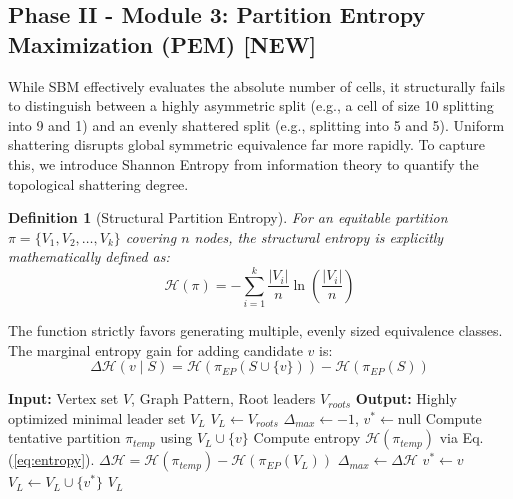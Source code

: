 \documentclass{IEEEtran}
\newtheorem{definition}{Definition}
\begin{document}
	\subsection{Phase II - Module 3: Partition Entropy Maximization (PEM) [NEW]}
	While SBM effectively evaluates the absolute number of cells, it structurally fails to distinguish between a highly asymmetric split (e.g., a cell of size 10 splitting into 9 and 1) and an evenly shattered split (e.g., splitting into 5 and 5). Uniform shattering disrupts global symmetric equivalence far more rapidly. To capture this, we introduce Shannon Entropy from information theory to quantify the topological shattering degree.
	
	\begin{definition}[Structural Partition Entropy]
		For an equitable partition $\pi = \{V_1, V_2, \dots, V_k\}$ covering $n$ nodes, the structural entropy is explicitly mathematically defined as:
		\begin{equation}
			\mathcal{H}(\pi) = - \sum_{i=1}^k \frac{|V_i|}{n} \ln \left( \frac{|V_i|}{n} \right) \label{eq:entropy}
		\end{equation}
	\end{definition}
	
	The function strictly favors generating multiple, evenly sized equivalence classes. The marginal entropy gain for adding candidate $v$ is:
	\begin{equation}
		\Delta \mathcal{H}(v \mid S) = \mathcal{H}(\pi_{EP}(S \cup \{v\})) - \mathcal{H}(\pi_{EP}(S))
	\end{equation}
	
	\begin{algorithm}[htbp]
		\caption{Partition Entropy Maximization (PEM)}
		\label{alg:pem}
		\begin{algorithmic}[1]
			\STATE \textbf{Input:} Vertex set $V$, Graph Pattern, Root leaders $V_{roots}$
			\STATE \textbf{Output:} Highly optimized minimal leader set $V_L$
			\STATE $V_L \leftarrow V_{roots}$
			\STATE $\Delta_{max} \leftarrow -1$, $v^* \leftarrow \text{null}$
			\STATE Compute tentative partition $\pi_{temp}$ using $V_L \cup \{v\}$
			\STATE Compute entropy $\mathcal{H}(\pi_{temp})$ via Eq. (\ref{eq:entropy}).
			\STATE $\Delta \mathcal{H} = \mathcal{H}(\pi_{temp}) - \mathcal{H}(\pi_{EP}(V_L))$
			\STATE $\Delta_{max} \leftarrow \Delta \mathcal{H}$
			\STATE $v^* \leftarrow v$
			\ENDIF
			\ENDFOR
			\STATE $V_L \leftarrow V_L \cup \{v^*\}$
			\ENDWHILE
			\RETURN $V_L$
		\end{algorithmic}
	\end{algorithm}
	
\end{document}
